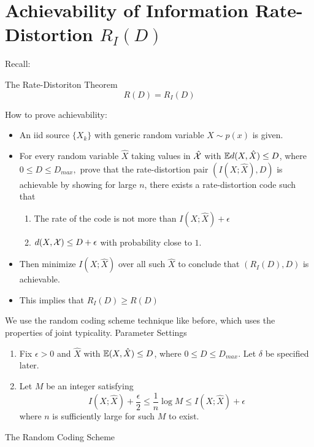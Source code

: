\documentclass[../main.tex]{subfiles}
\begin{document}
\section{Achievability of Information Rate-Distortion $R_I(D)$}
Recall: \begin{bbox}{The Rate-Distoriton Theorem}
    \[
    R(D) = R_I(D)
    \]
\end{bbox}
How to prove achievability:
\begin{itemize}
    \item An iid source $\{X_k\}$ with generic random variable $X\sim p(x)$ is given.
    \item For every random variable $\hat X$ taking values in $\hat {\mathcal{X}}$ with $\mathbb{E} d(X,\hat X)\leq D$, where $0\leq D\leq D_{max},$ prove that the rate-distortion pair $(I(X;\hat X),D)$ is achievable by showing for large $n$, there exists a rate-distortion code such that \begin{enumerate}
        \item The rate of the code is not more than $I(X;\hat X)+\epsilon$
        \item $d(X,\mathcal{X}) \leq D+\epsilon$ with probability close to $1.$
    \end{enumerate}
    \item Then minimize $I(X;\hat X)$ over all such $\hat X$ to conclude that $(R_I(D),D)$ is achievable.
    \item This implies that $R_I(D)\geq R(D)$
\end{itemize}
We use the random coding scheme technique like before, which uses the properties of joint typicality.
Parameter Settings
\begin{enumerate}
    \item Fix $\epsilon > 0$ and $\hat X$ with $\mathbb{E}(X,\hat X)\leq D$, where $0\leq D\leq D_{max}.$ Let $\delta$ be specified later.
    \item Let $M$ be an integer satisfying \[
    I(X;\hat X)+\frac{\epsilon}{2} \leq \frac{1}{n}\log M\leq I(X;\hat X) +\epsilon
    \] where $n$ is sufficiently large for such $M$ to exist.
\end{enumerate}
The Random Coding Scheme
\end{document}
